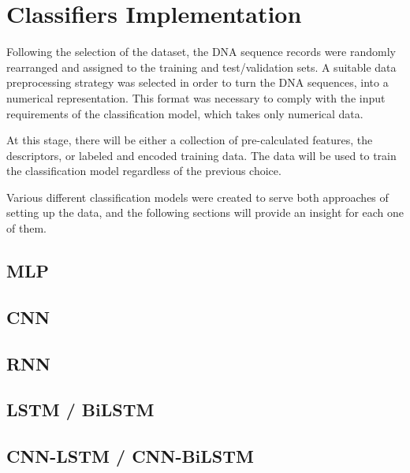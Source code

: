 \section{Classifiers Implementation}

Following the selection of the dataset, the \gls{DNA} sequence records were randomly rearranged and assigned to the training and test/validation sets. A suitable data preprocessing strategy was selected in order to turn the \gls{DNA} sequences, into a numerical representation. This format was necessary to comply with the input requirements of the classification model, which takes only numerical data.

At this stage, there will be either a collection of pre-calculated features, the descriptors, or labeled and encoded training data. The data will be used to train the classification model regardless of the previous choice.

Various different classification models were created to serve both approaches of setting up the data, and the following sections will provide an insight for each one of them.

\subsection{MLP}

\subsection{CNN}

\subsection{RNN}

\subsection{LSTM / BiLSTM}

\subsection{CNN-LSTM / CNN-BiLSTM}